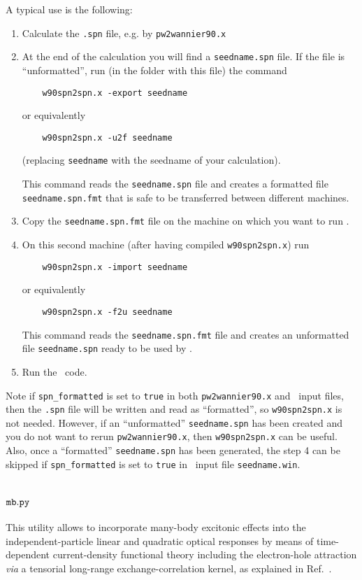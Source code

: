 A typical use is the following:
\begin{enumerate}
	\item Calculate the \verb|.spn| file, e.g. by \texttt{pw2wannier90.x}
	\item At the end of the calculation you will find a \verb|seedname.spn|
	file. If the file is ``unformatted'', run (in the folder with this file) the command
	\begin{verbatim}
	w90spn2spn.x -export seedname
	\end{verbatim}
	or equivalently
	\begin{verbatim}
	w90spn2spn.x -u2f seedname
	\end{verbatim}
	(replacing \verb|seedname| with the seedname of your calculation).
	
	This command reads the \verb|seedname.spn| file and creates a
	formatted file  \verb|seedname.spn.fmt| that is safe to be transferred
	between different machines.
	\item Copy the \verb|seedname.spn.fmt| file on the machine on
	which you want to run \postw.
	\item On this second machine (after having compiled
	\verb|w90spn2spn.x|) run
	\begin{verbatim}
	w90spn2spn.x -import seedname
	\end{verbatim}
	or equivalently
	\begin{verbatim}
	w90spn2spn.x -f2u seedname
	\end{verbatim}
	
	This command reads the \verb|seedname.spn.fmt| file and creates an
	unformatted file \verb|seedname.spn| ready to be used by \postw.
	
	\item Run the \postw\ code.
	
\end{enumerate}

Note if \texttt{spn\_formatted} is set to \texttt{true} in both 
\texttt{pw2wannier90.x} and \postw\ input files, then the \verb|.spn| file will 
be written and read as ``formatted'', so \texttt{w90spn2spn.x} is not needed. 
However, if an ``unformatted'' \verb|seedname.spn| has been created and 
you do not want to rerun \texttt{pw2wannier90.x}, then 
\texttt{w90spn2spn.x} can be useful. 
Also, once a ``formatted'' \verb|seedname.spn| has been generated, the step 4 can be skipped if 
\texttt{spn\_formatted} is set to \texttt{true} in \postw\ input file \verb|seedname.win|.

\section{$\tt{mb.py}$\label{sec:mb}}
This utility allows to incorporate many-body excitonic effects into the independent-particle linear and quadratic optical responses by means of time-dependent current-density functional theory including the electron-hole attraction \textit{via} a tensorial long-range exchange-correlation kernel, as explained in Ref.~\cite{garcia-goiricelaya-prb23}.

